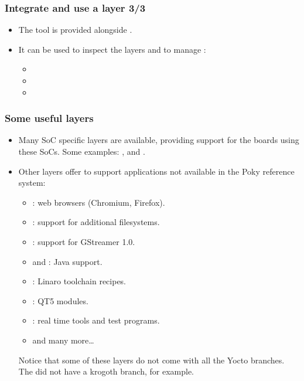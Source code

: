 \begin{frame}
  \frametitle{Integrate and use a layer 3/3}
  \begin{itemize}
    \item The  tool is provided alongside
      .
    \item It can be used to inspect the layers and to manage
      :
    \begin{itemize}
      \item {}
      \item {}
      \item {}
    \end{itemize}
  \end{itemize}
\end{frame}

\begin{frame}
  \frametitle{Some useful layers}
  \begin{itemize}
    \item Many SoC specific layers are available, providing support
      for the boards using these SoCs. Some examples: ,
       and .
    \item Other layers offer to support applications not available in
      the Poky reference system:
    \begin{itemize}
      \item {}: web browsers (Chromium, Firefox).
      \item {}: support for additional
        filesystems.
      \item {}: support for GStreamer 1.0.
      \item {} and : Java support.
      \item {}: Linaro toolchain recipes.
      \item {}: QT5 modules.
      \item {}: real time tools and test programs.
      \item {} and many more\dots
    \end{itemize}
    Notice that some of these layers do not come with all the Yocto
    branches. The  did not have a krogoth branch,
    for example.
  \end{itemize}
\end{frame}

